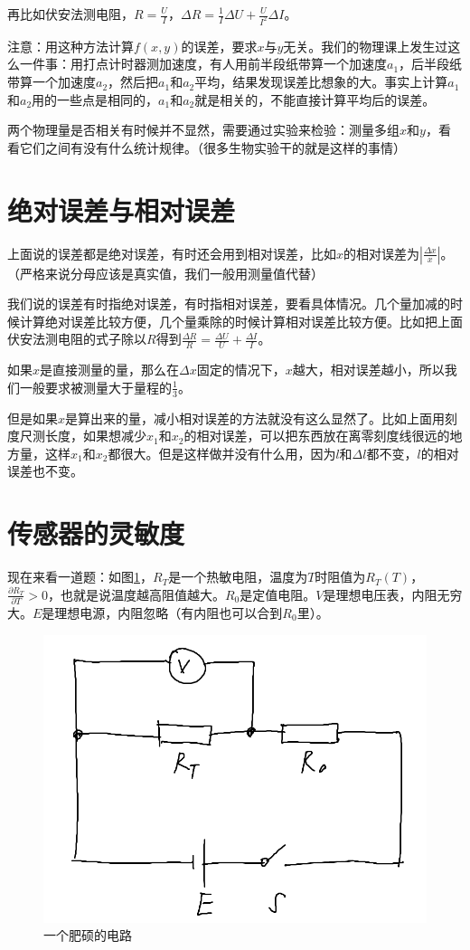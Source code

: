 再比如伏安法测电阻，$R=\frac{U}{I}$，$\Delta R=\frac{1}{I} \Delta U+\frac{U}{I^2} \Delta I$。

注意：用这种方法计算$f(x,y)$的误差，要求$x$与$y$无关。我们的物理课上发生过这么一件事：用打点计时器测加速度，有人用前半段纸带算一个加速度$a_1$，后半段纸带算一个加速度$a_2$，然后把$a_1$和$a_2$平均，结果发现误差比想象的大。事实上计算$a_1$和$a_2$用的一些点是相同的，$a_1$和$a_2$就是相关的，不能直接计算平均后的误差。

两个物理量是否相关有时候并不显然，需要通过实验来检验：测量多组$x$和$y$，看看它们之间有没有什么统计规律。（很多生物实验干的就是这样的事情）
\section{绝对误差与相对误差}
上面说的误差都是绝对误差，有时还会用到相对误差，比如$x$的相对误差为$|\frac{\Delta x}{x}|$。（严格来说分母应该是真实值，我们一般用测量值代替）

我们说的误差有时指绝对误差，有时指相对误差，要看具体情况。几个量加减的时候计算绝对误差比较方便，几个量乘除的时候计算相对误差比较方便。比如把上面伏安法测电阻的式子除以$R$得到$\frac{\Delta R}{R}=\frac{\Delta U}{U}+\frac{\Delta I}{I}$。

如果$x$是直接测量的量，那么在$\Delta x$固定的情况下，$x$越大，相对误差越小，所以我们一般要求被测量大于量程的$\frac{1}{3}$。

但是如果$x$是算出来的量，减小相对误差的方法就没有这么显然了。比如上面用刻度尺测长度，如果想减少$x_1$和$x_2$的相对误差，可以把东西放在离零刻度线很远的地方量，这样$x_1$和$x_2$都很大。但是这样做并没有什么用，因为$l$和$\Delta l$都不变，$l$的相对误差也不变。
\section{传感器的灵敏度}
现在来看一道题：如图\ref{fig-temp-detector}，$R_T$是一个热敏电阻，温度为$T$时阻值为$R_T(T)$，$\frac{\partial R_T}{\partial T}>0$，也就是说温度越高阻值越大。$R_0$是定值电阻。$V$是理想电压表，内阻无穷大。$E$是理想电源，内阻忽略（有内阻也可以合到$R_0$里）。
\begin{figure}[htb]
\centering
\includegraphics[scale=0.5]{fig/temp-detector.png}
\caption{一个肥硕的电路}
\label{fig-temp-detector}
\end{figure}

